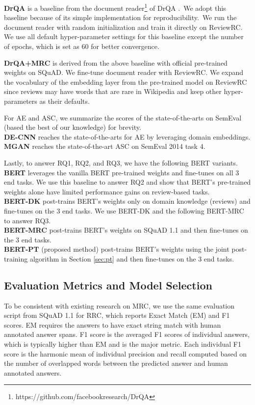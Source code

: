 \documentclass[11pt,a4paper]{article}
\begin{document}
\textbf{DrQA} is a baseline from the document reader\footnote{https://github.com/facebookresearch/DrQA} of DrQA \cite{chen2017reading}.~We adopt this baseline because of its simple implementation for reproducibility.~We run the document reader with random initialization and train it directly on ReviewRC.
We use all default hyper-parameter settings for this baseline except the number of epochs, which is set as 60 for better convergence.

\textbf{DrQA+MRC} is derived from the above baseline with official pre-trained weights on SQuAD.
We fine-tune document reader with ReviewRC. We expand the vocabulary of the embedding layer from the pre-trained model on ReviewRC since reviews may have words that are rare in Wikipedia and keep other hyper-parameters as their defaults.

For AE and ASC, we summarize the scores of the state-of-the-arts on SemEval (based the best of our knowledge) for brevity.\\
\textbf{DE-CNN} \cite{xu_acl2018} reaches the state-of-the-arts for AE by leveraging domain embeddings.\\
\textbf{MGAN} \cite{li2018exploiting} reaches the state-of-the-art ASC on SemEval 2014 task 4.

Lastly, to answer RQ1, RQ2, and RQ3, we have the following BERT variants.\\
\textbf{BERT} leverages the vanilla BERT pre-trained weights and fine-tunes on all 3 end tasks. We use this baseline to answer RQ2 and show that BERT's pre-trained weights alone have limited performance gains on review-based tasks.\\
\textbf{BERT-DK} post-trains BERT's weights only on domain knowledge (reviews) and fine-tunes on the 3 end tasks. We use BERT-DK and the following BERT-MRC to answer RQ3.\\
\textbf{BERT-MRC} post-trains BERT's weights on SQuAD 1.1 and then fine-tunes on the 3 end tasks.\\
\textbf{BERT-PT} (proposed method) post-trains BERT's weights using the joint post-training algorithm in Section \ref{sec:pt} and then fine-tunes on the 3 end tasks.

\subsection{Evaluation Metrics and Model Selection}
To be consistent with existing research on MRC,
we use the same evaluation script from SQuAD 1.1 \cite{rajpurkar2016squad} for RRC, which reports Exact Match (EM) and F1 scores.
EM requires the answers to have exact string match with human annotated answer spans.
F1 score is the averaged F1 scores of individual answers, which is typically higher than EM and is the major metric.
Each individual F1 score is the harmonic mean of individual precision and recall computed based on the number of overlapped words between the predicted answer and human annotated answers.
\end{document}
